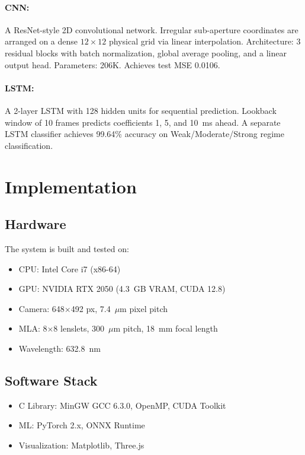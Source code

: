 \documentclass[twocolumn,10pt]{IEEEtran}
\begin{document}
\paragraph{CNN:} A ResNet-style 2D convolutional network. Irregular sub-aperture coordinates are arranged on a dense $12\times12$ physical grid via linear interpolation. Architecture: 3 residual blocks with batch normalization, global average pooling, and a linear output head. Parameters: 206K. Achieves test MSE 0.0106.

\paragraph{LSTM:} A 2-layer LSTM with 128 hidden units for sequential prediction. Lookback window of 10 frames predicts coefficients 1, 5, and 10~ms ahead. A separate LSTM classifier achieves 99.64\% accuracy on Weak/Moderate/Strong regime classification.

\section{Implementation}
\label{sec:impl}

\subsection{Hardware}
The system is built and tested on:
\begin{itemize}
\item CPU: Intel Core i7 (x86-64)
\item GPU: NVIDIA RTX 2050 (4.3~GB VRAM, CUDA 12.8)
\item Camera: 648$\times$492 px, 7.4~$\mu$m pixel pitch
\item MLA: 8$\times$8 lenslets, 300~$\mu$m pitch, 18~mm focal length
\item Wavelength: 632.8~nm
\end{itemize}

\subsection{Software Stack}
\begin{itemize}
\item C Library: MinGW GCC 6.3.0, OpenMP, CUDA Toolkit
\item ML: PyTorch 2.x, ONNX Runtime
\item Visualization: Matplotlib, Three.js
\end{itemize}
\end{document}
